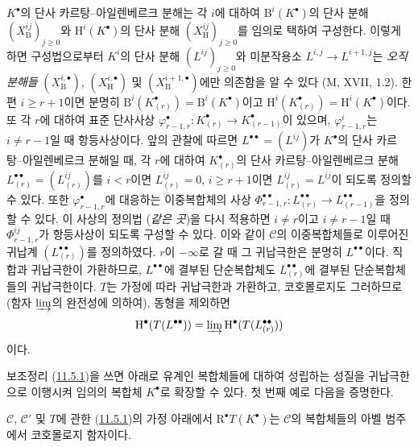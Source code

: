 $K^\bullet$의 단사 카르탕--아일렌베르크 분해는 각 $i$에 대하여
$\mathrm B^i(K^\bullet)$의 단사 분해
$(X_{\mathrm B}^{ij})_{j\geq0}$와 $\mathrm H^i(K^\bullet)$의 단사 분해
$(X_{\mathrm H}^{ij})_{j\geq0}$를 임의로 택하여 구성한다. 이렇게 하면
구성법으로부터 $K^i$의 단사 분해 $(L^{ij})_{j\geq0}$와 미분작용소
$L^{i,j}\to L^{i+1,j}$는 \emph{오직 분해들}
$(X_{\mathrm B}^{i,\bullet})$, $(X_{\mathrm H}^{i,\bullet})$ 및
$(X_{\mathrm B}^{i+1,\bullet})$에만 의존함을 알 수 있다
(M, XVII, 1.2). 한편 $i\geq r+1$이면 분명히
$\mathrm B^i(K_{(r)}^\bullet)=\mathrm B^i(K^\bullet)$이고
$\mathrm H^i(K_{(r)}^\bullet)=\mathrm H^i(K^\bullet)$이다. 또 각 $r$에
대하여 표준 단사사상
$\varphi_{r-1,r}^\bullet:K_{(r)}^\bullet\to K_{(r-1)}^\bullet$이 있으며,
$\varphi_{r-1,r}^i$는 $i\neq r-1$일 때 항등사상이다. 앞의 관찰에
따르면 $L^{\bullet\bullet}=(L^{ij})$가 $K^\bullet$의 단사
카르탕--아일렌베르크 분해일 때, 각 $r$에 대하여 $K_{(r)}^\bullet$의
단사 카르탕--아일렌베르크 분해
$L_{(r)}^{\bullet\bullet}=(L_{(r)}^{ij})$를
$i<r$이면 $L_{(r)}^{ij}=0$, $i\geq r+1$이면
$L_{(r)}^{ij}=L^{ij}$이 되도록 정의할 수 있다. 또한
$\varphi_{r-1,r}^\bullet$에 대응하는 이중복합체의 사상
$\Phi_{r-1,r}^{\bullet\bullet}:L_{(r)}^{\bullet\bullet}\to
L_{(r-1)}^{\bullet\bullet}$을 정의할 수 있다. 이 사상의 정의법
(\emph{같은 곳})을 다시 적용하면 $i\neq r$이고 $i\neq r-1$일 때
$\Phi_{r-1,r}^{ij}$가 항등사상이 되도록 구성할 수 있다. 이와 같이
$\mathcal C$의 이중복합체들로 이루어진 귀납계
$(L_{(r)}^{\bullet\bullet})$를 정의하였다. $r$이 $-\infty$로 갈 때
그 귀납극한은 분명히 $L^{\bullet\bullet}$이다. 직합과 귀납극한이
가환하므로, $L^{\bullet\bullet}$에 결부된 단순복합체도
$L_{(r)}^{\bullet\bullet}$에 결부된 단순복합체들의 귀납극한이다.
$T$는 가정에 따라 귀납극한과 가환하고, 코호몰로지도 그러하므로
(함자 $\varinjlim$의 완전성에 의하여), 동형을 제외하면
\[
  \mathrm H^\bullet(T(L^{\bullet\bullet}))=
  \varinjlim\mathrm H^\bullet(T(L_{(r)}^{\bullet\bullet}))
\]
이다.

보조정리 (\hyperref[0.11.5.1-ko]{11.5.1})을 쓰면 아래로 유계인
복합체들에 대하여 성립하는 성질을 귀납극한으로 이행시켜 임의의
복합체 $K^\bullet$로 확장할 수 있다. 첫 번째 예로 다음을 증명한다.

\begin{proposition}[11.5.2]
\label{0.11.5.2-ko}
$\mathcal C$, $\mathcal C'$ 및 $T$에 관한
(\hyperref[0.11.5.1-ko]{11.5.1})의 가정 아래에서
$\mathrm R^\bullet T(K^\bullet)$는 $\mathcal C$의 복합체들의 아벨
범주에서 코호몰로지 함자이다.
\end{proposition}

